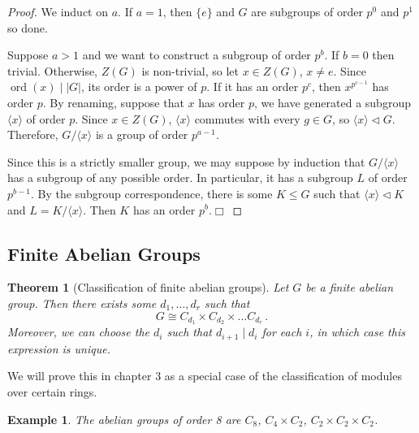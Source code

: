 \documentclass{article}
\theoremstyle{plain}\theoremheaderfont{\normalfont\itshape}\theorembodyfont{\rmfamily}\theoremseparator{.}\newtheorem*{rem}{Remark}\newtheorem*{ex}{Example}\newtheorem*{proof}{Proof}\newtheorem*{altp}{Alternative proof}\newtheorem*{nonex}{Non-Example}
\theoremstyle{plain}\theoremheaderfont{\normalfont\bfseries}\theorembodyfont{\rmfamily}\theoremseparator{.}\newtheorem{thm}{Theorem}[section]\newtheorem{lem}[thm]{Lemma}\newtheorem{prop}[thm]{Proposition}\newtheorem*{cor}{Corollary}\newtheorem{defn}[thm]{Definition}\newtheorem{clm}[thm]{Claim}\newtheorem{clminproof}{Claim}\newtheorem*{notn}{Notation}\newtheorem*{exer}{Exercise}\newtheorem*{lemnn}{Lemma}
\theoremstyle{break}\theoremheaderfont{\normalfont\itshape}\theorembodyfont{\rmfamily}\theoremseparator{.\medskip}\newtheorem*{proofskip}{Proof}\newtheorem*{exs}{Examples}\newtheorem*{rems}{Remarks}\newtheorem*{obs}{Observations}
\theoremstyle{break}\theoremheaderfont{\normalfont\bfseries}\theorembodyfont{\rmfamily}\theoremseparator{.\medskip}\newtheorem{lemskip}[thm]{Lemma}\newtheorem{defnskip}[thm]{Definition}\newtheorem{propskip}[thm]{Proposition}\newtheorem{thmskip}[thm]{Theorem}
\numberwithin{equation}{section}
\newcommand{\qed}{\hfill\ensuremath{\Box}}
\newcommand{\abs}[1]{\left|#1\right|}
\DeclareMathOperator*{\ord}{ord}
\begin{document}
    \begin{proof}
        We induct on \(a\). If \(a=1\), then \(\{e\}\) and \(G\) are subgroups of order \(p^0\) and \(p^1\) so done.

        Suppose \(a>1\) and we want to construct a subgroup of order \(p^b\). If \(b=0\) then trivial. Otherwise, \(Z(G)\) is non-trivial, so let \(x\in Z(G)\), \(x\ne e\). Since \(\ord(x)\mid\abs{G}\), its order is a power of \(p\). If it has an order \(p^c\), then \(x^{p^{c-1}}\) has order \(p\). By renaming, suppose that \(x\) has order \(p\), we have generated a subgroup \(\langle x\rangle\) of order \(p\). Since \(x\in Z(G)\), \(\langle x\rangle\) commutes with every \(g\in G\), so \(\langle x\rangle\lhd G\). Therefore, \(G/\langle x\rangle\) is a group of order \(p^{a-1}\).
        
        Since this is a strictly smaller group, we may suppose by induction that \(G/\langle x\rangle\) has a subgroup of any possible order. In particular, it has a subgroup \(L\) of order \(p^{b-1}\). By the subgroup correspondence, there is some \(K\le G\) such that \(\langle x\rangle\lhd K\) and \(L=K/\langle x\rangle\). Then \(K\) has an order \(p^b\).\qed
    \end{proof}
    \subsection{Finite Abelian Groups}
    \begin{thm}[Classification of finite abelian groups]
        Let \(G\) be a finite abelian group. Then there exists some \(d_1,\dots,d_r\) such that
        \[G\cong C_{d_1}\times C_{d_2}\times\dots C_{d_r}\,.\]
        Moreover, we can choose the \(d_i\) such that \(d_{i+1}\mid d_{i}\) for each \(i\), in which case this expression is unique.
    \end{thm}

    We will prove this in chapter 3 as a special case of the classification of modules over certain rings.

    \begin{ex}
        The abelian groups of order 8 are \(C_8\), \(C_4\times C_2\), \(C_2\times C_2\times C_2\).
    \end{ex}
\end{document}
